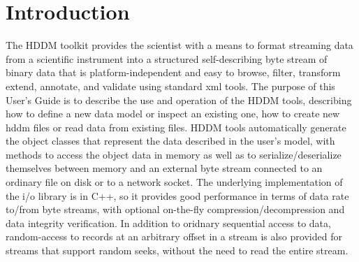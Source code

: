 \documentclass{revtex4}
\begin{document}
%
%
%
%

\section{Introduction}

The HDDM toolkit provides the scientist with a means to format streaming data
from a scientific instrument into a structured self-describing byte stream of
binary data that is platform-independent and easy to browse, filter, transform
extend, annotate, and validate using standard xml tools. The purpose of this 
User's Guide is to describe the use and operation of the HDDM tools, describing
how to define a new data model or inspect an existing one, how to create new
hddm files or read data from existing files. HDDM tools automatically generate
the object classes that represent the data described in the user's model, with
methods to access the object data in memory as well as to serialize/deserialize
themselves between memory and an external byte stream connected to an ordinary
file on disk or to a network socket. The underlying implementation of the i/o
library is in C++, so it provides good performance in terms of data rate to/from
byte streams, with optional on-{}the-{}fly compression/decompression and data 
integrity verification. In addition to oridnary sequential access to data,
random-{}access to records at an arbitrary offset in a stream is also provided
for streams that support random seeks, without the need to read the entire stream.
\end{document}
